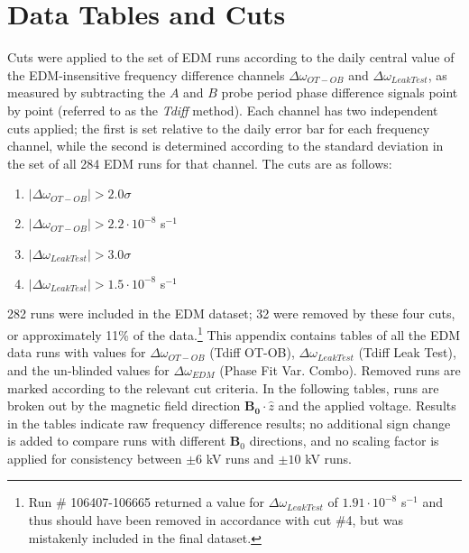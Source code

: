 \documentclass [10pt, twoside] {uwthesis}[2012/04/02]
\begin{document}
\chapter{Data Tables and Cuts} \label{Data_Cut_Appendix}
Cuts were applied to the set of EDM runs according to the daily central value of the EDM-insensitive frequency difference channels $\Delta\omega_{OT-OB}$ and $\Delta\omega_{Leak Test}$, as measured by subtracting the $A$ and $B$ probe period phase difference signals point by point (referred to as the \textit{Tdiff} method). Each channel has two independent cuts applied; the first is set relative to the daily error bar for each frequency channel, while the second is determined according to the standard deviation in the set of all 284 EDM runs for that channel. The cuts are as follows:
\begin{enumerate}
\item $|\Delta\omega_{OT-OB}| > 2.0 \sigma$ 
\item $|\Delta\omega_{OT-OB}| > 2.2 \cdot 10^{-8}$ s$^{-1}$
\item $|\Delta\omega_{Leak Test}| > 3.0 \sigma$ 
\item $|\Delta\omega_{Leak Test}| > 1.5 \cdot 10^{-8}$ s$^{-1}$ 
\end{enumerate}
282 runs were included in the EDM dataset; 32 were removed by these four cuts, or approximately 11\% of the data.\footnote{Run \# 106407-106665 returned a value for $\Delta\omega_{Leak Test}$ of $1.91 \cdot 10^{-8}$ s$^{-1}$ and thus should have been removed in accordance with cut \#4, but was mistakenly included in the final dataset.} This appendix contains tables of all the EDM data runs with values for $\Delta\omega_{OT-OB}$ (Tdiff OT-OB), $\Delta\omega_{Leak Test}$ (Tdiff Leak Test), and the un-blinded values for $\Delta\omega_{EDM}$ (Phase Fit Var. Combo). Removed runs are marked according to the relevant cut criteria. In the following tables, runs are broken out by the magnetic field direction $\mathbf{B_0} \cdot \hat{z}$ and the applied voltage. Results in the tables indicate raw frequency difference results; no additional sign change is added to compare runs with different $\mathbf{B}_0$ directions, and no scaling factor is applied for consistency between $\pm 6$ kV runs and $\pm 10$ kV runs.

\newpage
\end{document}
